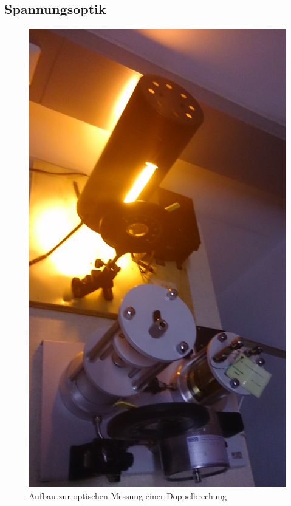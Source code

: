 \documentclass[12pt,a4paper]{article}
\begin{document}
\begin{multicols}{2}
\subsection{Spannungsoptik}

\begin{figure}[H]
	\centering
	\includegraphics[scale=0.055]{./data/PS5_2_Aufbau.jpg}
	\caption{Aufbau zur optischen Messung einer Doppelbrechung}
	\label{fig:spannung_aufbau}
\end{figure}


\end{multicols}
\end{document}
